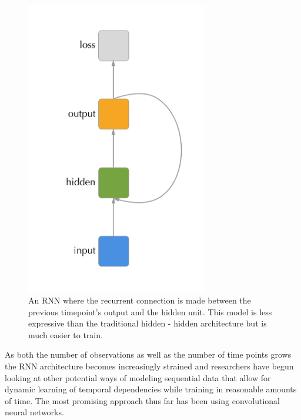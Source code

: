 \documentclass[]{book}
\theoremstyle{definition}
\theoremstyle{definition}
\theoremstyle{definition}
\theoremstyle{remark}
\begin{document}
\begin{figure}
\includegraphics[width=300]{figures/output_rnn} \caption{An RNN where the recurrent connection is made between the previous timepoint's output and the hidden unit. This model is less expressive than the traditional hidden - hidden architecture but is much easier to train.}\label{fig:outputrnn}
\end{figure}

As both the number of observations as well as the number of time points
grows the RNN architecture becomes increasingly strained and researchers
have begun looking at other potential ways of modeling sequential data
that allow for dynamic learning of temporal dependencies while training
in reasonable amounts of time. The most promising approach thus far has
been using convolutional neural networks.
\end{document}
